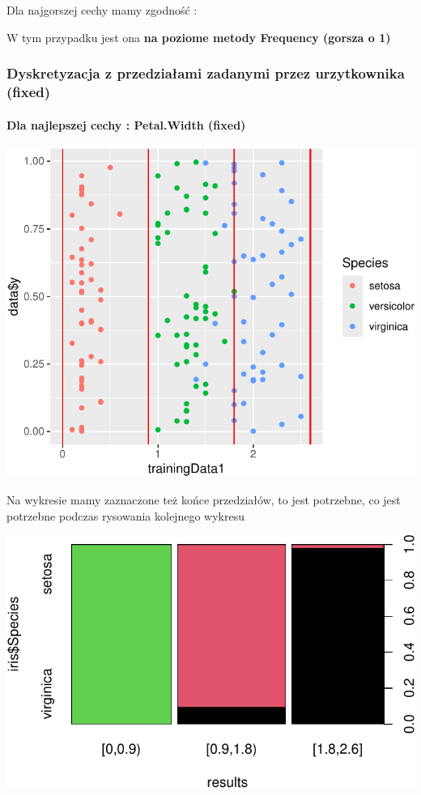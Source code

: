 \documentclass[
  12pt,
]{article}
\begin{document}
Dla najgorszej cechy mamy zgodność :

W tym przypadku jest ona \textbf{na poziome metody Frequency (gorsza o
1)}

\subsubsection{Dyskretyzacja z przedziałami zadanymi przez urzytkownika
(fixed)}\label{dyskretyzacja-z-przedziaux142ami-zadanymi-przez-urzytkownika-fixed}

\paragraph{Dla najlepszej cechy : Petal.Width
(fixed)}\label{dla-najlepszej-cechy-petal.width-fixed}

\begin{center}\includegraphics{Sprawozdanie2_files/figure-latex/givenRanges_najl-1} \end{center}

Na wykresie mamy zaznaczone też końce przedziałów, to jest potrzebne, co
jest potrzebne podczas rysowania kolejnego wykresu

\begin{center}\includegraphics{Sprawozdanie2_files/figure-latex/tabela_kondygnacji_4_najl-1} \end{center}
\end{document}
